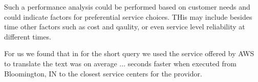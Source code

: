 Such a performance analysis could be performed based on customer needs
and could indicate factors for preferential service choices. THis may
include besides time other factors such as cost and qaulity, or even
service level reliability at different times.

For us we found that in for the short query we used the service
offered by AWS to translate the text was on average ...  seconds
faster when executed from Bloomington, IN to the closest service
centers for the providor.



